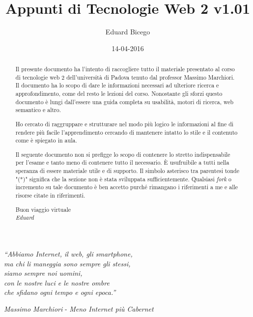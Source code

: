\documentclass[a4paper,11pt]{report}
\begin{document}
\title{Appunti di Tecnologie Web 2 v1.01}
\author{Eduard Bicego}
\date{14-04-2016}

\maketitle



\begin{abstract}
	Il presente documento ha l'intento di raccogliere tutto il materiale presentato al corso di tecnologie web 2 dell'università di Padova tenuto dal professor Massimo Marchiori. Il documento ha lo scopo di dare le informazioni necessari ad ulteriore ricerca e approfondimento, come del resto le lezioni del corso. Nonostante gli sforzi questo documento è lungi dall'essere una guida completa su usabilità, motori di ricerca, web semantico e altro. \par
	
	Ho cercato di raggruppare e strutturare nel modo più logico le informazioni al fine di rendere più facile l'apprendimento cercando di mantenere intatto lo stile e il contenuto come è spiegato in aula. \par
	
	Il seguente documento non si prefigge lo scopo di contenere lo stretto indispensabile per l'esame e tanto meno di contenere tutto il necessario. 
	È usufruibile a tutti nella speranza di essere materiale utile e di supporto. Il simbolo asterisco tra parentesi tonde "(*)" significa che la sezione non è stata sviluppata sufficientemente. Qualsiasi \emph{fork} o incremento su tale documento è ben accetto purché rimangano i riferimenti a me e alle risorse citate in riferimenti.
	\begin{flushright}
		Buon viaggio virtuale \\
		\emph{Eduard}
	\end{flushright}
	
	
\end{abstract}

\hypersetup{linkcolor=black}
\tableofcontents
\listoffigures

\newpage
	\begin{center}
		\emph{``Abbiamo Internet, il web, gli smartphone,\\
		 ma chi li maneggia sono sempre gli stessi,\\
		  siamo sempre noi uomini, \\
		  con le nostre luci e le nostre ombre \\
		  che sfidano ogni tempo e ogni epoca.''\\}
	\end{center}
	\begin{flushright}
		\emph{Massimo Marchiori} - \emph{Meno Internet più Cabernet}	
	\end{flushright}
\end{document}
